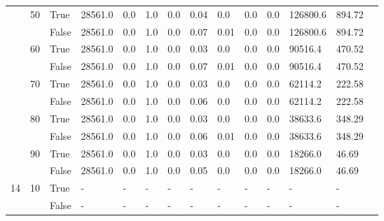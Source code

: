 \begin{landscape}
\begin{small}
\begin{longtable}[c]{@{}lll|ll|ll|ll|ll|lll@{}}
   & 50 & True  & 28561.0         & 0.0            & 1.0           & 0.0           & 0.04          & 0.0           & 0.0           & 0.0           & 126800.6      & 894.72      &  \\
   &    & False & 28561.0         & 0.0            & 1.0           & 0.0           & 0.07          & 0.01          & 0.0           & 0.0           & 126800.6      & 894.72      &  \\
   & 60 & True  & 28561.0         & 0.0            & 1.0           & 0.0           & 0.03          & 0.0           & 0.0           & 0.0           & 90516.4       & 470.52      &  \\
   &    & False & 28561.0         & 0.0            & 1.0           & 0.0           & 0.07          & 0.01          & 0.0           & 0.0           & 90516.4       & 470.52      &  \\
   & 70 & True  & 28561.0         & 0.0            & 1.0           & 0.0           & 0.03          & 0.0           & 0.0           & 0.0           & 62114.2       & 222.58      &  \\
   &    & False & 28561.0         & 0.0            & 1.0           & 0.0           & 0.06          & 0.0           & 0.0           & 0.0           & 62114.2       & 222.58      &  \\
   & 80 & True  & 28561.0         & 0.0            & 1.0           & 0.0           & 0.03          & 0.0           & 0.0           & 0.0           & 38633.6       & 348.29      &  \\
   &    & False & 28561.0         & 0.0            & 1.0           & 0.0           & 0.06          & 0.01          & 0.0           & 0.0           & 38633.6       & 348.29      &  \\
   & 90 & True  & 28561.0         & 0.0            & 1.0           & 0.0           & 0.03          & 0.0           & 0.0           & 0.0           & 18266.0       & 46.69       &  \\
   &    & False & 28561.0         & 0.0            & 1.0           & 0.0           & 0.05          & 0.0           & 0.0           & 0.0           & 18266.0       & 46.69       &  \\
  \midrule
14 & 10 & True  & -               & -              & -             & -             & -             & -             & -             & -             & -             & -           &  \\
   &    & False & -               & -              & -             & -             & -             & -             & -             & -             & -             & -           &  \\

\end{longtable}
\end{small}
\end{landscape}

